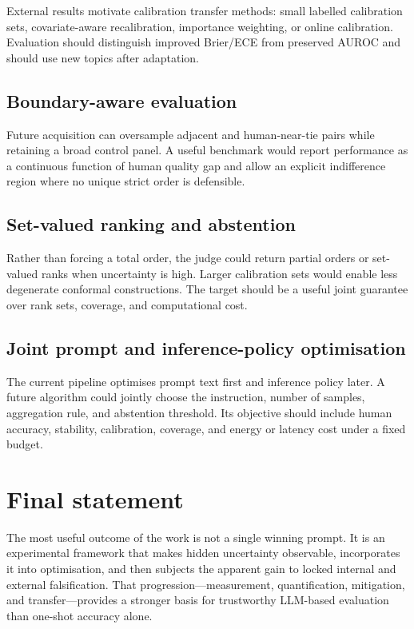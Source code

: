 \documentclass[11pt,twoside,a4paper]{report}
\begin{document}
External results motivate calibration transfer methods: small labelled calibration
sets, covariate-aware recalibration, importance weighting, or online calibration.
Evaluation should distinguish improved Brier/ECE from preserved AUROC and should use
new topics after adaptation.

\subsection{Boundary-aware evaluation}

Future acquisition can oversample adjacent and human-near-tie pairs while retaining
a broad control panel.  A useful benchmark would report performance as a continuous
function of human quality gap and allow an explicit indifference region where no
unique strict order is defensible.

\subsection{Set-valued ranking and abstention}

Rather than forcing a total order, the judge could return partial orders or
set-valued ranks when uncertainty is high.  Larger calibration sets would enable less
degenerate conformal constructions.  The target should be a useful joint guarantee
over rank sets, coverage, and computational cost.

\subsection{Joint prompt and inference-policy optimisation}

The current pipeline optimises prompt text first and inference policy later.  A
future algorithm could jointly choose the instruction, number of samples, aggregation
rule, and abstention threshold.  Its objective should include human accuracy,
stability, calibration, coverage, and energy or latency cost under a fixed budget.

\section{Final statement}

The most useful outcome of the work is not a single winning prompt.  It is an
experimental framework that makes hidden uncertainty observable, incorporates it
into optimisation, and then subjects the apparent gain to locked internal and
external falsification.  That progression---measurement, quantification, mitigation,
and transfer---provides a stronger basis for trustworthy LLM-based evaluation than
one-shot accuracy alone.
\end{document}
